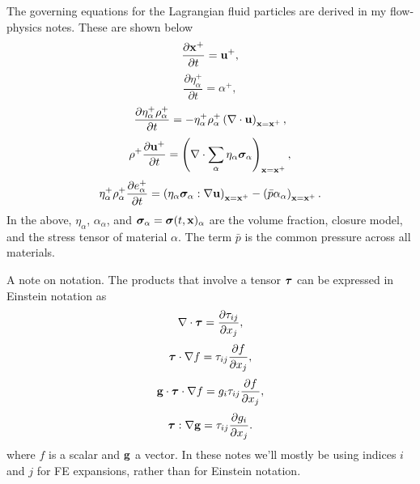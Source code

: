 \documentclass[11pt]{report}
\begin{document}
The governing equations for the Lagrangian fluid particles are derived in my flow-physics notes. These are shown below
\begin{equation}
    \label{eq:lag_gov_evol_x}
    \frac{\partial \mathbf{x}^+}{\partial t} = \mathbf{u}^+,
\end{equation}
\begin{equation}
    \label{eq:lag_gov_evol_eta}
    \frac{\partial \eta^+_\alpha}{\partial t} = \alpha^+,
\end{equation}
\begin{equation}
    \label{eq:lag_gov_evol_rho}
    \frac{\partial \eta^+_\alpha \rho^+_\alpha}{\partial t} = -\eta^+_\alpha \rho^+_\alpha \left( \nabla \cdot \mathbf{u} \right)_{\mathbf{x} = \mathbf{x}^+},
\end{equation}
\begin{equation}
    \label{eq:lag_gov_evol_u}
    \rho^+ \frac{\partial \mathbf{u}^+}{\partial t} = \left ( \nabla \cdot \sum_\alpha \eta_\alpha \bm \sigma_\alpha \right )_{\mathbf{x} = \mathbf{x}^+},
\end{equation}
\begin{equation}
    \label{eq:lag_gov_evol_e}
    \eta^+_\alpha \rho^+_\alpha \frac{\partial e^+_\alpha}{\partial t} = \left ( \eta_\alpha \bm \sigma_\alpha : \nabla \mathbf{u} \right )_{\mathbf{x} = \mathbf{x}^+} - \left( \bar{p} \alpha_\alpha \right)_{\mathbf{x} = \mathbf{x}^+}. 
\end{equation}
In the above, $\eta_\alpha$, $\alpha_\alpha$, and $\bm \sigma_\alpha = \bm \sigma(t,\mathbf{x})_\alpha$ are the volume fraction, closure model, and the stress tensor of material $\alpha$. The term $\bar{p}$ is the common pressure across all materials.

A note on notation. The products that involve a tensor $\bm \tau$ can be expressed in Einstein notation as
\begin{equation*}
    \nabla \cdot \bm \tau = \frac{\partial \tau_{ij}}{\partial x_j},
\end{equation*}
\begin{equation*}
    \bm \tau \cdot \nabla f = \tau_{ij} \frac{\partial f}{\partial x_j},
\end{equation*}
\begin{equation*}
    \mathbf{g} \cdot \bm \tau \cdot \nabla f = g_i \tau_{ij} \frac{\partial f}{\partial x_j},
\end{equation*}
\begin{equation*}
    \bm \tau : \nabla \mathbf{g} = \tau_{ij} \frac{\partial g_i}{\partial x_j}.
\end{equation*}
where $f$ is a scalar and $\mathbf{g}$ a vector. In these notes we'll mostly be using indices $i$ and $j$ for FE expansions, rather than for Einstein notation.
\end{document}
